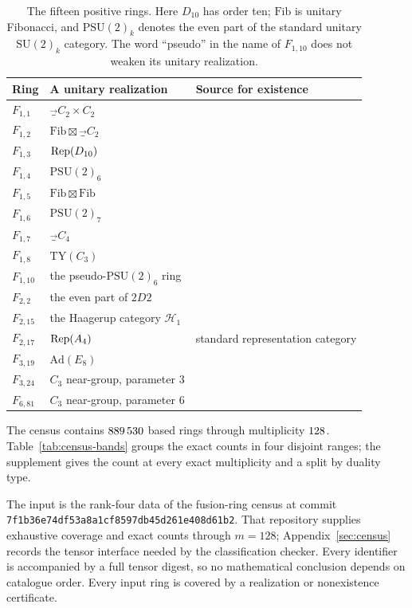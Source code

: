 \begin{table}[ht]
\centering
\begin{tabular}{lll}
\toprule
Ring & A unitary realization & Source for existence\\
\midrule
$F_{1,1}$ & $\Vec_{C_2\times C_2}$ & \cite{LPR}\\
$F_{1,2}$ & $\mathrm{Fib}\boxtimes\Vec_{C_2}$ & \cite{LPR}\\
$F_{1,3}$ & $\operatorname{Rep}(D_{10})$ & \cite{LPR}\\
$F_{1,4}$ & $\mathrm{PSU}(2)_6$ & \cite{LPR}\\
$F_{1,5}$ & $\mathrm{Fib}\boxtimes\mathrm{Fib}$ & \cite{LPR}\\
$F_{1,6}$ & $\mathrm{PSU}(2)_7$ & \cite{LPR}\\
$F_{1,7}$ & $\Vec_{C_4}$ & \cite{LPR}\\
$F_{1,8}$ & $\mathrm{TY}(C_3)$ & \cite{LPR}\\
$F_{1,10}$ & the pseudo-$\mathrm{PSU}(2)_6$ ring & \cite{LPR}\\
$F_{2,2}$ & the even part of $2D2$ & \cite[Theorem 3.1]{EIP}\\
$F_{2,15}$ & the Haagerup category $\mathcal H_1$ & \cite[Table 2]{GrossmanSnyder}\\
$F_{2,17}$ & $\operatorname{Rep}(A_4)$ & standard representation category\\
$F_{3,19}$ & $\mathrm{Ad}(E_8)$ & \cite{EvansJones}\\
$F_{3,24}$ & $C_3$ near-group, parameter $3$ & \cite[Theorem 9.1]{Izumi}\\
$F_{6,81}$ & $C_3$ near-group, parameter $6$ & \cite[Theorem 10.19]{Izumi}\\
\bottomrule
\end{tabular}
\caption{The fifteen positive rings. Here $D_{10}$ has order ten;
$\mathrm{Fib}$ is unitary Fibonacci, and $\mathrm{PSU}(2)_k$ denotes the even
part of the standard unitary $\mathrm{SU}(2)_k$ category. The word
``pseudo'' in the name of $F_{1,10}$ does not weaken its unitary realization.}
\label{tab:models}
\end{table}

The census contains $889\,530$ based rings through multiplicity
$128$. Table~\ref{tab:census-bands} groups the exact counts
in four disjoint ranges; the supplement gives the count at every exact
multiplicity and a split by duality type.

The input is the rank-four data of the fusion-ring census
\cite{Census} at commit
\texttt{7f1b36e74df53a8a1cf8597db45d261e408d61b2}.
That repository supplies exhaustive coverage and exact counts through
$m=128$; Appendix~\ref{sec:census} records the tensor interface needed by
the classification checker. Every identifier is accompanied by a full
tensor digest, so no mathematical conclusion depends on catalogue order.
Every input ring is covered by a realization or nonexistence certificate.

